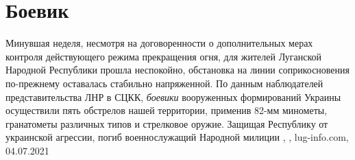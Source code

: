  
 
 
 
 
\chapter{Боевик}

Минувшая неделя, несмотря на договоренности о дополнительных мерах контроля
действующего режима прекращения огня, для жителей Луганской Народной Республики
прошла неспокойно, обстановка на линии соприкосновения по-прежнему оставалась
стабильно напряженной.  По данным наблюдателей представительства ЛНР в СЦКК,
\emph{боевики} вооруженных формирований Украины осуществили пять обстрелов нашей
территории, применив 82-мм минометы, гранатометы различных типов и стрелковое
оружие.  Защищая Республику от украинской агрессии, погиб военнослужащий
Народной милиции
, , lug-info.com, 04.07.2021
